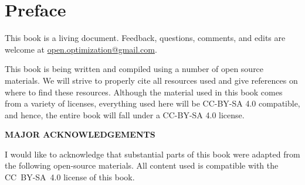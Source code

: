 \chapter*{Preface}

This book is a living document.  Feedback, questions, comments, and edits are welcome at \href{mailto:open.optimization@gmail.com}{open.optimization@gmail.com}.

This book is being written and compiled using a number of open source materials.   We will  strive to properly cite all resources used and give references on where to find these resources.  Although the material used in this book comes from a variety of licenses, everything used here will be CC-BY-SA 4.0 compatible, and hence, the entire book will fall under a CC-BY-SA 4.0 license.

\begin{center}
\fontsize{14pt}{16pt}\selectfont\textcolor{titletextcolour}{\textbf{MAJOR ACKNOWLEDGEMENTS}}
\end{center}

I would like to acknowledge that substantial parts of this book were adapted from the following open-source materials.
All content used is compatible with the CC~BY-SA~4.0 license of this book.

